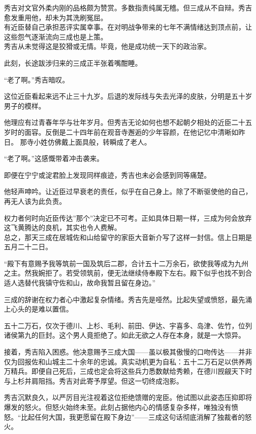 \documentclass[
]{article}
\begin{document}
秀吉对文官外柔内刚的品格颇为赞赏。多数指责纯属无稽。但三成从不自辩。秀吉愈发重用他，却未为其洗刷冤屈。\\
有近臣替自己承担恶评实属幸事。在对明战争带来的七年不满情绪达到顶点前，让这些怨气逐渐流向三成也是上策。\\
秀吉从未觉得这是狡猾或无情。毕竟，他是成功统一天下的政治家。

此刻，长途跋涉归来的三成正半张着嘴酣睡。

``老了啊。''秀吉暗叹。

这位近臣看起来远不止三十九岁。后退的发际线与失去光泽的皮肤，分明是五十岁男子的模样。

他理应有过青春年华与壮年岁月。但秀吉无论如何也想不起朝夕相处的近臣二十五岁时的面容。反倒是二十四年前在观音寺邂逅的少年容颜，在他记忆中清晰如昨日。
那寺小姓仿佛戴上面具般，转瞬成了老人。

``老了啊。''这感慨带着冲击袭来。

即便在宁宁或淀君脸上发现同样痕迹，秀吉也未必会感到同等痛楚。

他轻声呻吟。让近臣过早衰老的责任，似乎在自己身上。除了不断驱使他的自己，再无人该为此负责。

权力者何时向近臣传达''那个''决定已不可考。正如具体日期一样，三成为何会放弃这飞黄腾达的良机，其实也令人费解。\\
总之，那天三成在居城佐和山给留守的家臣大音新介写了这样一封信。信上日期是五月二十二日。

``殿下有意赐予我等筑前一国及筑后二郡，合计五十二万余石，欲使我等成为九州之主。然我婉拒了。若受领筑前，便无法继续侍奉殿下左右。殿下似乎也找不到合适人选替代我镇守佐和山，故命我暂且留在身边。''

三成的辞谢在权力者心中激起复杂情绪。秀吉先是哑然。比起失望或愤怒，最先涌上心头的是难以置信。

五十二万石，仅次于德川、上杉、毛利、前田、伊达、宇喜多、岛津、佐竹，位列诸侯第九的巨封。这个男人竟拒绝了。如此无欲之人存在本身，就是一大惊异。

接着，秀吉陷入困惑。他决意赐予三成大国------虽以极其傲慢的口吻传达------并非仅为回报佐和山城主二十余年的忠诚。真实动机更为自私：五十二万石足以供养两万精兵。即便自己死后，三成也定会将这些兵力悉数献给秀赖，在德川觊觎天下时与上杉并肩阻挡。秀吉对此寄予厚望。但这一切终成泡影。

秀吉沉默良久，以严厉目光注视着这位拒绝馈赠的宠臣。他试图以此姿态压抑即将爆发的怒火。但怒火始终未至。此刻占据他内心的情感复杂多样，唯独没有愤怒。``比起任何大国，我更愿留在殿下身边''------三成这句话彻底消解了独裁者的怒火。
\end{document}
